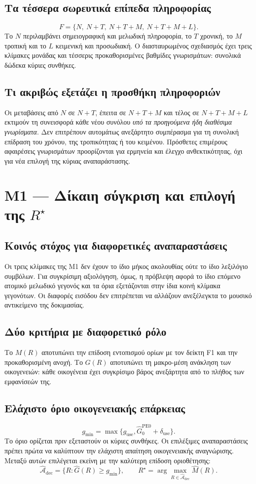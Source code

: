 \documentclass[11pt,a4paper]{extarticle}
\begin{document}
\subsection*{Τα τέσσερα σωρευτικά επίπεδα πληροφορίας}
\[
F=\{N,\ N+T,\ N+T+M,\ N+T+M+L\}.
\]
Το \(N\) περιλαμβάνει σημειογραφική και μελωδική πληροφορία, το \(T\) χρονική, το \(M\) τροπική και το \(L\) κειμενική και προσωδιακή. Ο διασταυρωμένος σχεδιασμός έχει τρεις κλίμακες μονάδας και τέσσερις προκαθορισμένες βαθμίδες γνωρισμάτων: συνολικά δώδεκα κύριες συνθήκες.

\subsection*{Τι ακριβώς εξετάζει η προσθήκη πληροφοριών}
Οι μεταβάσεις από \(N\) σε \(N+T\), έπειτα σε \(N+T+M\) και τέλος σε \(N+T+M+L\) εκτιμούν τη συνεισφορά κάθε νέου συνόλου \emph{υπό τα προηγούμενα ήδη διαθέσιμα γνωρίσματα}. Δεν επιτρέπουν αυτομάτως ανεξάρτητο συμπέρασμα για τη συνολική επίδραση του χρόνου, της τροπικότητας ή του κειμένου. Πρόσθετες επιμέρους αφαιρέσεις γνωρισμάτων προορίζονται για ερμηνεία και έλεγχο ανθεκτικότητας, όχι για νέα επιλογή της κύριας αναπαράστασης.


\section{M1 — Δίκαιη σύγκριση και επιλογή της \(R^\star\)}
\subsection*{Κοινός στόχος για διαφορετικές αναπαραστάσεις}
Οι τρεις κλίμακες της M1 δεν έχουν το ίδιο μήκος ακολουθίας ούτε το ίδιο λεξιλόγιο συμβόλων. Για συγκρίσιμη αξιολόγηση, όμως, η πρόβλεψη αφορά το ίδιο επόμενο ατομικό μελωδικό γεγονός και τα όρια εξετάζονται στην ίδια κοινή κλίμακα γεγονότων. Οι διαφορές εισόδου δεν επιτρέπεται να αλλάζουν ανεξέλεγκτα το μουσικό αντικείμενο της δοκιμασίας.

\subsection*{Δύο κριτήρια με διαφορετικό ρόλο}
Το \(M(R)\) αποτυπώνει την επίδοση εντοπισμού ορίων με τον δείκτη F1 και την προκαθορισμένη ανοχή. Το \(G(R)\) αποτυπώνει τη μακρο-μέση ανάκληση των οικογενειών: κάθε οικογένεια έχει συγκρίσιμο βάρος ανεξάρτητα από το πλήθος των εμφανίσεών της.

\subsection*{Ελάχιστο όριο οικογενειακής επάρκειας}
\[
g_{\min}=\max\{g_{\mathrm{use}},\widehat G_0^{\mathrm{PE0}}+\delta_{\mathrm{use}}\}.
\]
Το όριο ορίζεται πριν εξεταστούν οι κύριες συνθήκες. Οι επιλέξιμες αναπαραστάσεις πρέπει πρώτα να καλύπτουν την ελάχιστη απαίτηση οικογενειακής αναγνώρισης. Μεταξύ αυτών επιλέγεται εκείνη με την καλύτερη επίδοση οριοθέτησης:
\[
\widehat{\mathcal A}_{\mathrm{dec}}=\{R:\widehat G(R)\ge g_{\min}\},\qquad
R^\star=\arg\max_{R\in\widehat{\mathcal A}_{\mathrm{dec}}}\widehat M(R).
\]
\end{document}
